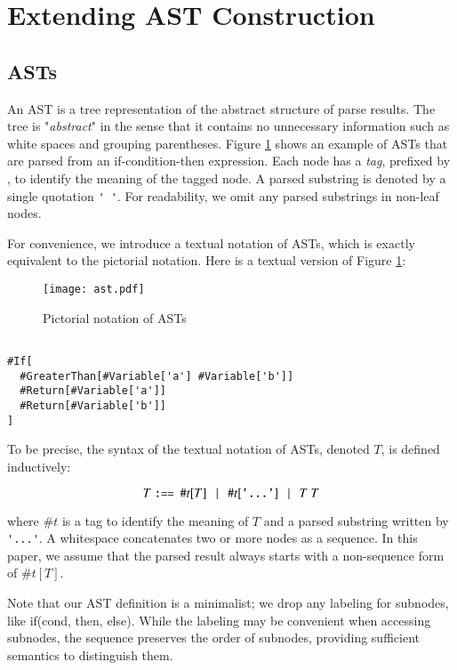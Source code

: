 \documentclass[JIP]{ipsj}
\begin{document}
\section{Extending AST Construction}

\subsection{ASTs}

An AST is a tree representation of the abstract structure of parse results. The tree is "{\em abstract}" in the  sense that it contains no unnecessary information such as white spaces and grouping parentheses. Figure \ref{fig:ast} shows an example of ASTs that are parsed from an if-condition-then expression. Each node has a {\em tag}, prefixed by \kw{\#}, to identify the meaning of the tagged node. A parsed substring is denoted by a single quotation \verb|' '|. For readability, we omit any parsed substrings in non-leaf nodes.  

For convenience, we introduce a textual notation of ASTs, which is exactly equivalent to the pictorial notation. Here is a textual version of Figure \ref{fig:ast}:

\begin{figure}[tb]
\texttt{[image: ast.pdf]}
\caption{Pictorial notation of ASTs}
\label{fig:ast}
\end{figure}

{\small \begin{verbatim}

#If[
  #GreaterThan[#Variable['a'] #Variable['b']]
  #Return[#Variable['a']]
  #Return[#Variable['b']]
] 
\end{verbatim}}

To be precise, the syntax of the textual notation of ASTs, denoted $T$, is defined inductively:

\[
 T ~ \verb|:==| ~~ \#t[T] ~~~ | ~~~ \#t[\verb|'...'|] ~~~ | ~~~T ~ T
\]

\noindent where $\#t$ is a tag to identify the meaning of $T$ and a parsed substring written by \verb|'...'|. A whitespace concatenates two or more nodes as a sequence. In this paper, we assume that the parsed result always starts with a non-sequence form of $\#t[T]$. 

Note that our AST definition is a minimalist; we drop any labeling for subnodes, like if(cond, then, else). While the labeling may be convenient when accessing subnodes, the sequence preserves the order of subnodes, providing sufficient semantics to distinguish them.  
\end{document}

